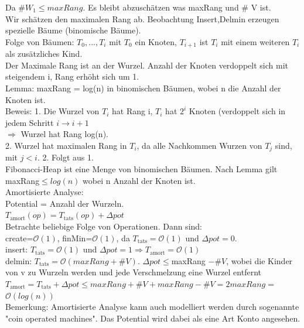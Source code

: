 \documentclass[a4paper]{article}
\newcommand{\oh}[1]{$\mathcal{O}(#1)$}
\begin{document}
Da $\# W_1 \leq maxRang$. Es bleibt abzuschätzen was maxRang und \# V ist.\\
Wir schätzen den maximalen Rang ab. Beobachtung Insert,Delmin erzeugen spezielle Bäume (binomische Bäume).\\
Folge von Bäumen: $T_0,...,T_i$ mit $T_0$ ein Knoten, $T_{i+1}$ ist $T_i$ mit einem weiteren $T_i$ als zusätzliches Kind.\\
Der Maximale Rang ist an der Wurzel. Anzahl der Knoten verdoppelt sich mit steigendem i, Rang erhöht sich um 1.\\
Lemma: maxRang = log(n) in binomischen Bäumen, wobei n die Anzahl der Knoten ist.\\
Beweis: 1. Die Wurzel von $T_i$ hat Rang i, $T_i$ hat $2^i$ Knoten (verdoppelt sich in jedem Schritt $i\rightarrow i+1$\\
\hspace*{0.5cm}$\Rightarrow$ Wurzel hat Rang log(n).\\
\hspace*{0.5cm}2. Wurzel hat maximalen Rang in $T_i$, da alle Nachkommen Wurzen von $T_j$ sind, mit $j<i$. 2. Folgt aus 1.\\
Fibonacci-Heap ist eine Menge von binomischen Bäumen. Nach Lemma gilt maxRang$\leq log(n)$ wobei n Anzahl der Knoten ist.\\
Amortisierte Analyse:\\
\hspace*{0.5cm} Potential = Anzahl der Wurzeln.\\
$T_{\text{amort}}(op)=T_{\text{tats}}(op) + \Delta pot$\\
Betrachte beliebige Folge von Operationen. Dann sind:\\
create=\oh{1}, finMin=\oh{1}, da $T_{\text{tats}}=$\oh{1} und $\Delta pot=0$.\\
insert: $T_{\text{tats}}=$\oh{1} und $\Delta pot=1 \Rightarrow T_{\text{amort}}=$\oh{1}\\
delmin: $T_{\text{tats}}=$\oh{maxRang+\#V}. $\Delta pot \leq $maxRang $-\#V$, wobei die Kinder von v zu Wurzeln werden und jede Verschmelzung eine Wurzel entfernt\\
\hspace*{0.5cm} $T_{\text{amort}} = T_{\text{tats}}+\Delta pot \leq maxRang +\#V + maxRang -\#V=2maxRang = $\oh{log(n)}\\
Bemerkung: Amortisierte Analyse kann auch modelliert werden durch sogenannte "coin operated machines". Das Potential wird dabei als eine Art Konto angesehen. \\
\end{document}
